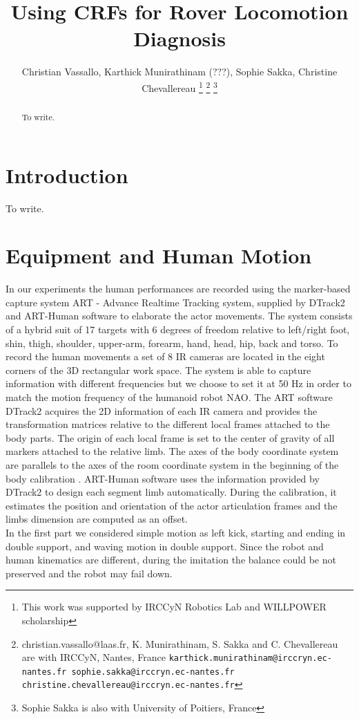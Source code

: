 \documentclass[a4paper, 10pt, conference]{ieeeconf}
\title{\LARGE \bf Using CRFs for Rover Locomotion Diagnosis}
\author{Christian Vassallo, Karthick Munirathinam (???), Sophie Sakka, Christine Chevallereau 
\thanks{This work was supported by IRCCyN Robotics Lab and WILLPOWER scholarship}%
\thanks{christian.vassallo@laas.fr, K. Munirathinam, S. Sakka and C. Chevallereau are with IRCCyN, Nantes, France
        {\tt\small karthick.munirathinam@irccryn.ec-nantes.fr sophie.sakka@irccryn.ec-nantes.fr christine.chevallereau@irccryn.ec-nantes.fr}}%
\thanks{Sophie Sakka is also with University of Poitiers, France}%
}
\begin{document}
\maketitle
\thispagestyle{empty}
\pagestyle{empty}


\begin{abstract}
To write.\par
\end{abstract}


\section{Introduction}

To write. \par



\section{Equipment and Human Motion}

In our experiments the human performances are recorded using the marker-based capture system ART - Advance Realtime Tracking system, supplied by DTrack2 and ART-Human software to elaborate the actor movements. The system consists of a hybrid suit of 17 targets with 6 degrees of freedom relative to left/right foot, shin, thigh, shoulder, upper-arm, forearm, hand, head, hip, back and torso.
To record the human movements a set of 8 IR cameras are located in the eight corners of the 3D rectangular work space. The system is able to capture information with different frequencies but we choose to set it at 50 Hz in order to match the motion frequency of the humanoid robot NAO.
The ART software DTrack2 acquires the 2D information of each IR camera and provides the transformation matrices relative to the different local frames attached to the body parts. The origin of each local frame is set to the center of gravity of all markers attached to the relative limb. The axes of the body coordinate system are parallels to the axes of the room coordinate system in the beginning
of the body calibration \cite{GmbH2012}.
ART-Human software uses the information provided by DTrack2 to design each segment limb automatically. During the calibration, it estimates the position and orientation of the actor articulation frames and the limbs dimension are computed as an offset.\\
In the first part we considered simple motion as left kick, starting and ending in double support, and waving motion in double support.
Since the robot and human kinematics are different, during the imitation the balance could be not preserved and the robot may fail down.
\end{document}
